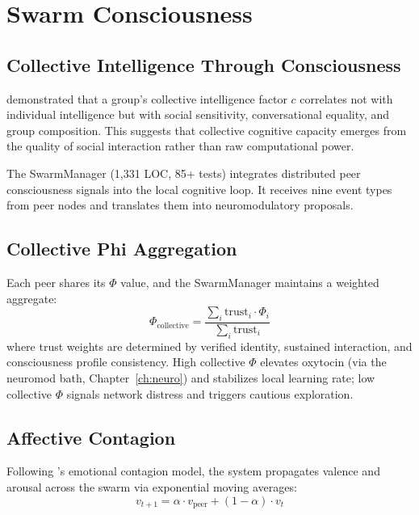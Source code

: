 \documentclass[12pt]{book}
\begin{document}
\chapter{Swarm Consciousness}
\label{ch:swarm}

\section{Collective Intelligence Through Consciousness}

\citet{woolley2010} demonstrated that a group's collective intelligence factor $c$ correlates not with individual intelligence but with social sensitivity, conversational equality, and group composition. This suggests that collective cognitive capacity emerges from the quality of social interaction rather than raw computational power.

The SwarmManager (1,331 LOC, 85+ tests) integrates distributed peer consciousness signals into the local cognitive loop. It receives nine event types from peer nodes and translates them into neuromodulatory proposals.

\section{Collective Phi Aggregation}

Each peer shares its $\Phi$ value, and the SwarmManager maintains a weighted aggregate:
\begin{equation}\label{eq:collective-phi}
\Phi_{\text{collective}} = \frac{\sum_i \text{trust}_i \cdot \Phi_i}{\sum_i \text{trust}_i}
\end{equation}
where trust weights are determined by verified identity, sustained interaction, and consciousness profile consistency. High collective $\Phi$ elevates oxytocin (via the neuromod bath, Chapter~\ref{ch:neuro}) and stabilizes local learning rate; low collective $\Phi$ signals network distress and triggers cautious exploration.

\section{Affective Contagion}

Following \citet{hatfield1993}'s emotional contagion model, the system propagates valence and arousal across the swarm via exponential moving averages:
\begin{equation}
v_{t+1} = \alpha \cdot v_{\text{peer}} + (1 - \alpha) \cdot v_t
\end{equation}
\end{document}
